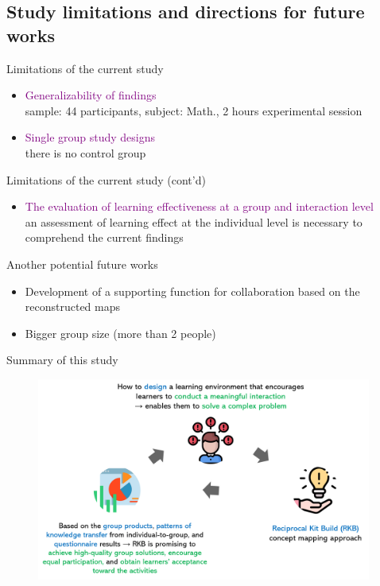 \subsection{Study limitations and directions for future works}
\begin{frame}{Limitations of the current study}
    \begin{itemize}
        \item <1>\textcolor{purple}{Generalizability of findings}\\
        {\small sample: 44 participants, subject: Math., 2 hours experimental session}
        \item <2>\textcolor{purple}{Single group study designs}\\
        {\small there is no control group}
    \end{itemize}
\end{frame}

\begin{frame}{Limitations of the current study (cont'd)}
    \begin{itemize}
        \item \textcolor{purple}{The evaluation of learning effectiveness at a group and interaction level}\\
        {\small an assessment of learning effect at the individual level is 
        necessary to comprehend the current findings}
    \end{itemize}
\end{frame}

\begin{frame}{Another potential future works}
    \begin{itemize}
        \item Development of a supporting function for collaboration based on the reconstructed maps\\
        \item Bigger group size (more than 2 people)\\
    \end{itemize}
\end{frame}

\begin{frame}{Summary of this study}
   \begin{figure}[tb]
       \begin{center}
           \includegraphics[width=110mm]{images/summary.png} 
       \end{center}
   \end{figure}
\end{frame}


